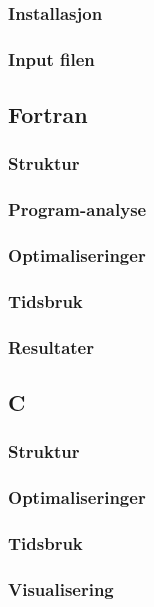 \documentclass[10pt,a4paper, norsk]{article}
\begin{document}
\subsubsection*{Installasjon }
\subsubsection*{Input filen}


\subsection*{Fortran}
\subsubsection*{Struktur}
\subsubsection*{Program-analyse}
\subsubsection*{Optimaliseringer}
\subsubsection*{Tidsbruk}
\subsubsection*{Resultater}



\subsection*{C}

\subsubsection*{Struktur}
\subsubsection*{Optimaliseringer}
\subsubsection*{Tidsbruk}
\subsubsection*{Visualisering}
\end{document}
